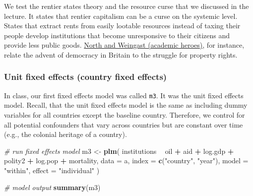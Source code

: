 \documentclass[]{article}
\newenvironment{Shaded}{\begin{snugshade}}{\end{snugshade}}
\newcommand{\KeywordTok}[1]{\textcolor[rgb]{0.13,0.29,0.53}{\textbf{#1}}}
\newcommand{\DataTypeTok}[1]{\textcolor[rgb]{0.13,0.29,0.53}{#1}}
\newcommand{\StringTok}[1]{\textcolor[rgb]{0.31,0.60,0.02}{#1}}
\newcommand{\CommentTok}[1]{\textcolor[rgb]{0.56,0.35,0.01}{\textit{#1}}}
\newcommand{\OperatorTok}[1]{\textcolor[rgb]{0.81,0.36,0.00}{\textbf{#1}}}
\newcommand{\NormalTok}[1]{#1}
\theoremstyle{definition}
\theoremstyle{definition}
\theoremstyle{definition}
\theoremstyle{remark}
\begin{document}
We test the rentier states theory and the resource curse that we
discussed in the lecture. It states that rentier capitalism can be a
curse on the systemic level. States that extract rents from easily
lootable resources instead of taxing their people develop institutions
that become unresponsive to their citizens and provide less public
goods.
\href{https://www.cambridge.org/core/journals/journal-of-economic-history/article/constitutions-and-commitment-evolution-of-institutions-governing-public-choice-in-seventeenth-century-england/2E0D2B2D3490BE5C556D836ACB096362}{North
and Weingast (academic heroes)}, for instance, relate the advent of
democracy in Britain to the struggle for property rights.

\subsubsection{Unit fixed effects (country fixed
effects)}\label{unit-fixed-effects-country-fixed-effects}

In class, our first fixed effects model was called \texttt{m3}. It was
the unit fixed effects model. Recall, that the unit fixed effects model
is the same as including dummy variables for all countries except the
baseline country. Therefore, we control for all potential confounders
that vary across countries but are constant over time (e.g., the
colonial heritage of a country).

\begin{Shaded}
\begin{Highlighting}[]
\CommentTok{# run fixed effects model}
\NormalTok{m3 <-}\StringTok{ }\KeywordTok{plm}\NormalTok{(}
\NormalTok{  institutions }\OperatorTok{~}\StringTok{ }\NormalTok{oil }\OperatorTok{+}\StringTok{ }\NormalTok{aid }\OperatorTok{+}\StringTok{ }\NormalTok{log.gdp }\OperatorTok{+}\StringTok{ }\NormalTok{polity2 }\OperatorTok{+}\StringTok{ }\NormalTok{log.pop }\OperatorTok{+}\StringTok{ }\NormalTok{mortality,}
  \DataTypeTok{data =}\NormalTok{ a,}
  \DataTypeTok{index =} \KeywordTok{c}\NormalTok{(}\StringTok{"country"}\NormalTok{, }\StringTok{"year"}\NormalTok{),}
  \DataTypeTok{model =} \StringTok{"within"}\NormalTok{,}
  \DataTypeTok{effect =} \StringTok{"individual"}
\NormalTok{  )}

\CommentTok{# model output}
\KeywordTok{summary}\NormalTok{(m3)}
\end{Highlighting}
\end{Shaded}
\end{document}
